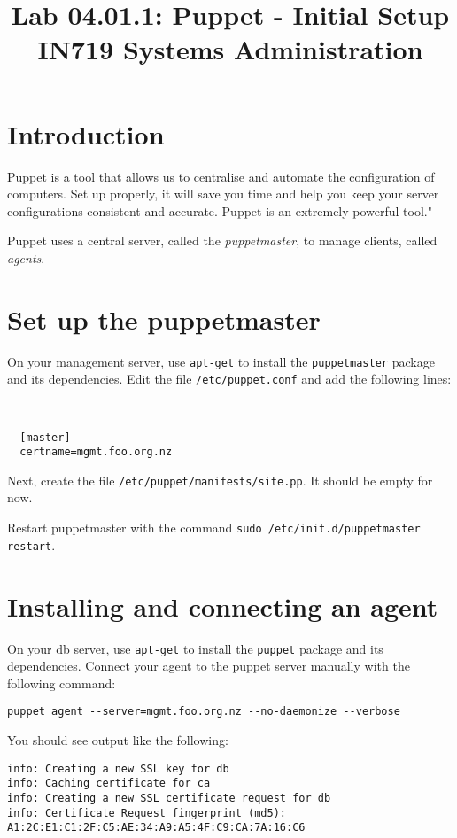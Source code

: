 \documentclass{article}
\begin{document}
\title{Lab 04.01.1: Puppet - Initial Setup \\ IN719 Systems Administration}
\date{}
\maketitle

\section*{Introduction}
Puppet is a tool that allows us to centralise and automate the configuration of computers.  Set up properly, it will save you time and help you keep your server configurations consistent and accurate.  Puppet is an extremely powerful tool."

Puppet uses a central server, called the \emph{puppetmaster}, to manage clients, called \emph{agents}.

\section{Set up the puppetmaster}
On your management server, use \texttt{apt-get} to install the \texttt{puppetmaster} package and its dependencies.  Edit the file \texttt{/etc/puppet.conf} and add the following lines:

\
\begin{verbatim}
  [master]
  certname=mgmt.foo.org.nz
\end{verbatim}

Next, create the file \texttt{/etc/puppet/manifests/site.pp}.  It should be empty for now.

Restart puppetmaster with the command \texttt{sudo /etc/init.d/puppetmaster restart}.

\section{Installing and connecting an agent}
On your db server, use \texttt{apt-get} to install the \texttt{puppet} package and its dependencies.  Connect your agent to the puppet server manually with the following command:

\begin{verbatim}
puppet agent --server=mgmt.foo.org.nz --no-daemonize --verbose
\end{verbatim}

You should see output like the following:

\begin{verbatim}
info: Creating a new SSL key for db
info: Caching certificate for ca
info: Creating a new SSL certificate request for db
info: Certificate Request fingerprint (md5): A1:2C:E1:C1:2F:C5:AE:34:A9:A5:4F:C9:CA:7A:16:C6

\end{verbatim}
\end{document}
